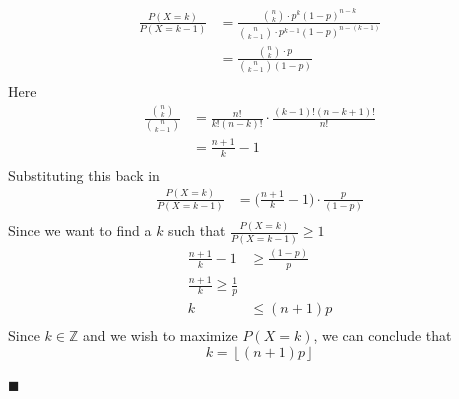 \documentclass[11pt, oneside]{article}   	%
\newcommand*{\QEDA}{\hfill\ensuremath{\blacksquare}}         %
\begin{document}
\begin{align*}
	\frac{P(X=k)}{P(X=k-1)} & = \frac{{n \choose k} \cdot p^k (1-p)^{n-k}}{{n \choose k-1} \cdot p^{k-1} (1-p)^{n-(k-1)}}\\
	& = \frac{{n \choose k} \cdot p}{{n \choose k-1}(1-p)}\\
\end{align*}
Here
	\begin{align*}
	\frac{{n \choose k}}{{n \choose k-1}} & = \frac{n!}{k! (n-k)!} \cdot \frac{(k-1)! (n-k+1)!}{n!} \\
	& = \frac{n+1}{k} - 1\\
\end{align*}
Substituting this back in
	\begin{align*}
		\frac{P(X=k)}{P(X=k-1)} & = \Big(\frac{n+1}{k} - 1 \Big) \cdot \frac{p}{(1-p)}\\
	\end{align*}
Since we want to find a $k$ such that $\frac{P(X=k)}{P(X=k-1)} \geq 1$
	\begin{align*}
		\frac{n+1}{k} - 1 & \geq \frac{(1-p)}{p}\\
		\frac{n+1}{k} \geq \frac{1}{p} \\
		k & \leq (n+1)p \\
	\end{align*}
Since $k \in \mathbb{Z}$ and we wish to maximize $P(X=k)$, we can conclude that
	$$k = \left \lfloor{(n+1)p}\right \rfloor $$
	
\QEDA
\end{document}
